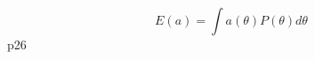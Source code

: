 \documentclass[11pt]{article}
\begin{document}
        \begin{equation}
            E(a) = \int a(\theta) P(\theta) d\theta
        \end{equation}
        p26








\end{document}
